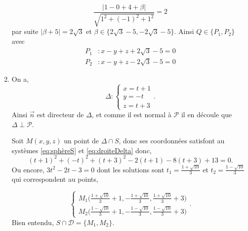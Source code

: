 \documentclass{article}
\begin{document}
\begin{enumerate}
	$$\frac{\Big|1-0+4+\beta\Big|}{\sqrt{1^2+(-1)^2+1^2}}=2$$
	par suite $\Big|\beta+5\Big|=2\sqrt{3}$ et $\beta\in\{2\sqrt{3}-5, -2\sqrt{3}-5\}$. Ainsi $Q\in\{P_1,P_2\}$ avec
	\begin{align*}
		P_1&:x-y+z+2\sqrt3-5=0\\
		P_2&:x-y+z-2\sqrt3-5=0
	\end{align*}
\item On a, \begin{equation}
		\Delta:\begin{cases}
			x=t+1\\
			y=-t\\
			z=t+3
		\end{cases}
		.\label{eq:droiteDelta}\end{equation}
Ainsi $\vec{n}$ est directeur de $\Delta$, et comme il est normal à $\mathcal{P}$ il en découle que $\Delta\perp\mathcal{P}$.

Soit  $M(x,y,z)$ un point de $\Delta\cap S$, donc ses coordonnées satisfont au systèmes \eqref{eq:sphèreS} et \eqref{eq:droiteDelta} donc,  \[
	(t+1)^2+(-t)^2+(t+3)^2-2(t+1)-8(t+3)+13=0
.\] 
Ou encore, $3t^2-2t-3=0$ dont les solutions sont $t_1=\frac{1+\sqrt{10}}{3}$ et $t_2=\frac{1-\sqrt{10}}{3}$ qui correspondent au points,

$$\begin{cases}
	M_1\Big(\frac{1+\sqrt{10}}{3}+1,-\frac{1+\sqrt{10}}{3},\frac{1+\sqrt{10}}{3}+3\Big)\\
	M_2\Big(\frac{1-\sqrt{10}}{3}+1,-\frac{1-\sqrt{10}}{3},\frac{1-\sqrt{10}}{3}+3\Big)
\end{cases}.
$$
Bien entendu, $S\cap\mathcal{D}=\{M_1,M_2\}$.
\end{enumerate}
\end{document}
